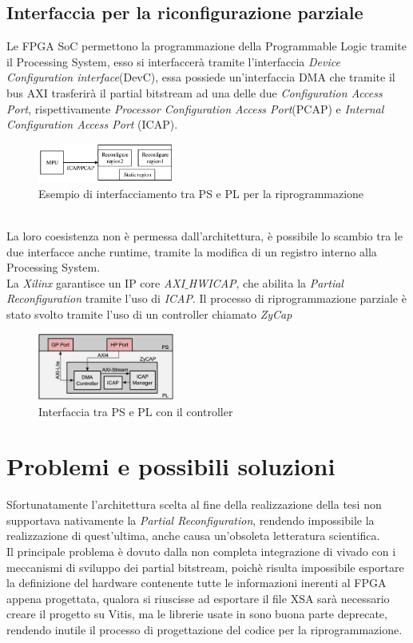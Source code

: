 \subsection{Interfaccia per la riconfigurazione parziale}
Le FPGA SoC permettono la programmazione della Programmable Logic tramite il Processing System, esso si interfaccerà tramite l'interfaccia \textit{Device Configuration interface}(DevC), essa possiede un'interfaccia DMA che tramite il bus AXI trasferirà il partial bitstream ad una delle due \textit{Configuration Access Port}, rispettivamente \textit{Processor Configuration Access Port}(PCAP) e \textit{Internal Configuration Access Port} (ICAP).
\begin{figure}
    \centering
    \includegraphics[width=0.4\textwidth]{images/PRR.png}
    \caption{Esempio di interfacciamento tra PS e PL per la riprogrammazione\cite{PRR2}}
    \label{fig:my_label}
\end{figure}\\
La loro coesistenza non è permessa dall'architettura, è possibile lo scambio tra le due interfacce anche runtime, tramite la modifica di un registro interno alla Processing System.\\
La \textit{Xilinx} garantisce un IP core \textit{AXI$\_$HWICAP}, che abilita la \textit{Partial Reconfiguration} tramite l'uso di \textit{ICAP}. Il processo di riprogrammazione parziale è stato svolto tramite l'uso di un controller chiamato \textit{ZyCap}\cite{PRR}
\begin{figure}
    \centering
    \includegraphics[width=0.4\textwidth]{images/ZyCap.png}
    \caption{Interfaccia tra PS e PL con il controller}
    \label{fig:my_label}
\end{figure}
\section{Problemi e possibili soluzioni}
Sfortunatamente l'architettura scelta al fine della realizzazione della tesi non supportava nativamente la \textit{Partial Reconfiguration}, rendendo impossibile la realizzazione di quest'ultima, anche causa un'obsoleta letteratura scientifica.\\
Il principale problema è dovuto dalla non completa integrazione di vivado con i meccanismi di sviluppo dei partial bitstream, poichè risulta impossibile esportare la definizione del hardware contenente tutte le informazioni inerenti al FPGA appena progettata, qualora si riuscisse ad esportare il file XSA sarà necessario creare il progetto su Vitis, ma le librerie usate in \cite{PRR} sono buona parte deprecate, rendendo inutile il processo di progettazione del codice per la riprogrammazione.\\
